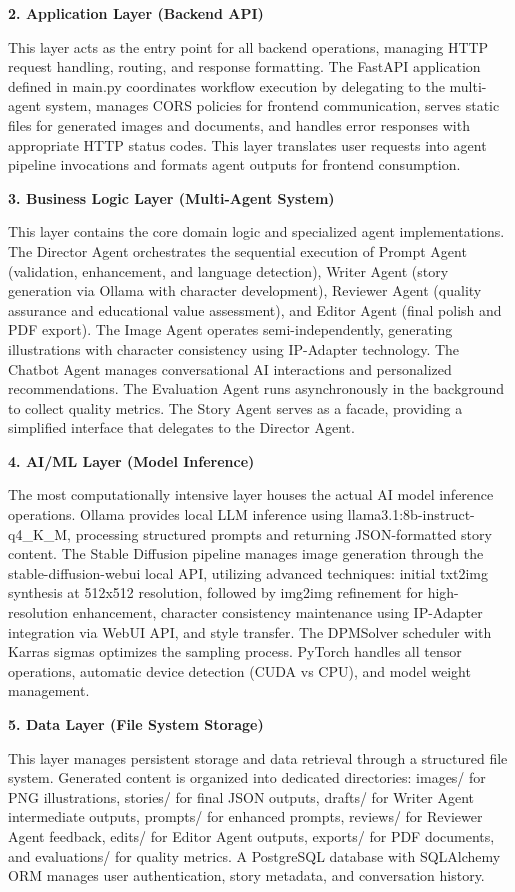 \textbf{2. Application Layer (Backend API)}

This layer acts as the entry point for all backend operations, managing HTTP request handling, routing, and response formatting. The FastAPI application defined in main.py coordinates workflow execution by delegating to the multi-agent system, manages CORS policies for frontend communication, serves static files for generated images and documents, and handles error responses with appropriate HTTP status codes. This layer translates user requests into agent pipeline invocations and formats agent outputs for frontend consumption.

\textbf{3. Business Logic Layer (Multi-Agent System)}

This layer contains the core domain logic and specialized agent implementations. The Director Agent orchestrates the sequential execution of Prompt Agent (validation, enhancement, and language detection), Writer Agent (story generation via Ollama with character development), Reviewer Agent (quality assurance and educational value assessment), and Editor Agent (final polish and PDF export). The Image Agent operates semi-independently, generating illustrations with character consistency using IP-Adapter technology. The Chatbot Agent manages conversational AI interactions and personalized recommendations. The Evaluation Agent runs asynchronously in the background to collect quality metrics. The Story Agent serves as a facade, providing a simplified interface that delegates to the Director Agent.

\textbf{4. AI/ML Layer (Model Inference)}

The most computationally intensive layer houses the actual AI model inference operations. Ollama provides local LLM inference using llama3.1:8b-instruct-q4\_K\_M, processing structured prompts and returning JSON-formatted story content. The Stable Diffusion pipeline manages image generation through the stable-diffusion-webui local API, utilizing advanced techniques: initial txt2img synthesis at 512x512 resolution, followed by img2img refinement for high-resolution enhancement, character consistency maintenance using IP-Adapter integration via WebUI API, and style transfer. The DPMSolver scheduler with Karras sigmas optimizes the sampling process. PyTorch handles all tensor operations, automatic device detection (CUDA vs CPU), and model weight management.

\textbf{5. Data Layer (File System Storage)}

This layer manages persistent storage and data retrieval through a structured file system. Generated content is organized into dedicated directories: images/ for PNG illustrations, stories/ for final JSON outputs, drafts/ for Writer Agent intermediate outputs, prompts/ for enhanced prompts, reviews/ for Reviewer Agent feedback, edits/ for Editor Agent outputs, exports/ for PDF documents, and evaluations/ for quality metrics. A PostgreSQL database with SQLAlchemy ORM manages user authentication, story metadata, and conversation history.

